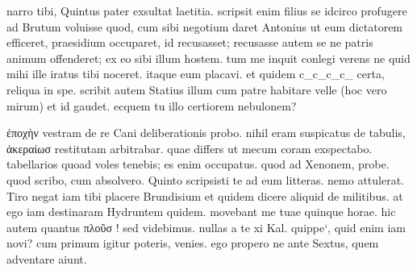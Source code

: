 


 narro tibi, Quintus pater exsultat laetitia. scripsit enim filius se idcirco profugere ad Brutum voluisse quod, cum sibi negotium daret Antonius ut eum dictatorem efficeret, praesidium occuparet, id recusasset; recusasse autem se ne patris animum offenderet; ex eo sibi illum hostem. tum me inquit conlegi verens ne quid mihi ille iratus tibi noceret. itaque eum placavi. et quidem c_c_c_c_ certa, reliqua in spe. scribit autem Statius illum cum patre habitare velle (hoc vero mirum) et id gaudet. ecquem tu illo certiorem nebulonem?

 ἐποχὴν vestram de re Cani deliberationis probo. nihil eram suspicatus de tabulis, ἀκεραίωσ restitutam arbitrabar. quae differs ut mecum coram exspectabo. tabellarios quoad voles tenebis; es enim occupatus. quod ad Xenonem, probe. quod scribo, cum absolvero. Quinto scripsisti te ad eum litteras. nemo attulerat. Tiro negat iam tibi placere Brundisium et quidem dicere aliquid de militibus. at ego iam destinaram Hydruntem quidem. movebant me tuae quinque horae. hic autem quantus πλοῦσ ! sed videbimus. nullas a te xi Kal. quippe`, quid enim iam novi? cum primum igitur poteris, venies. ego propero ne ante Sextus, quem adventare aiunt.
